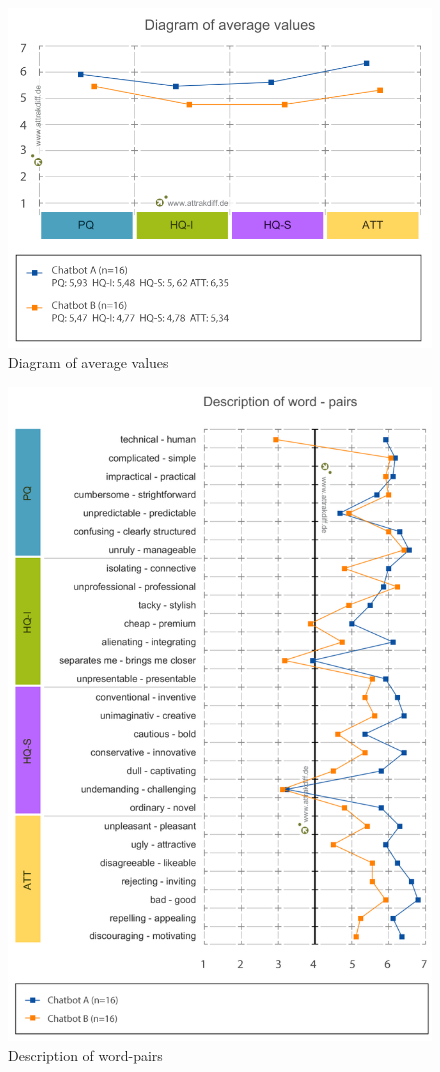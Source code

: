 \begin{figure}[h]
    \centering
    \includegraphics[scale=0.5]{figures/Diagram-of-average-values.png}
    \caption{Diagram of average values}
    \label{fig:diagval}
\end{figure}

\begin{figure}[h]
    \centering
    \includegraphics[scale=0.4]{figures/Description-of-word-pairs.png}
    \caption{Description of word-pairs}
    \label{fig:wordpairs}
\end{figure}